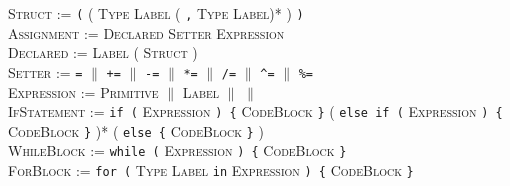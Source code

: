 \documentclass{article}
\newcommand{\code}[1]{\colorbox{light-gray}{\texttt{#1}}}
\begin{document}
\textsc{Struct} := \code{(} ( \textsc{Type} \textsc{Label} ( \code{,} \textsc{Type} \textsc{Label})* ) \code{)} \\

\textsc{Assignment} := \textsc{Declared} \textsc{Setter} \textsc{Expression} \\

\textsc{Declared} := \textsc{Label} ( \textsc{Struct} ) \\

\textsc{Setter} := \code{=} $\|$ \code{+=} $\|$ \code{-=} $\|$ \code{*=} $\|$ \code{/=} $\|$ \code{\^{}=} $\|$ \code{\%=} \\

\textsc{Expression} := \textsc{Primitive} $\|$ \textsc{Label} $\|$ $\|$ \\

\textsc{IfStatement} := \code{if (} \textsc{Expression} \code{) \{} \textsc{CodeBlock} \code{\}} ( \code{else if (} \textsc{Expression} \code{) \{} \textsc{CodeBlock} \code{\}} )* ( \code{else \{} \textsc{CodeBlock} \code{\}} ) \\

\textsc{WhileBlock} := \code{while (} \textsc{Expression} \code{) \{} \textsc{CodeBlock} \code{\}} \\

\textsc{ForBlock} := \code{for (} \textsc{Type} \textsc{Label} \code{in} \textsc{Expression} \code{) \{} \textsc{CodeBlock} \code{\}}
\end{document}
